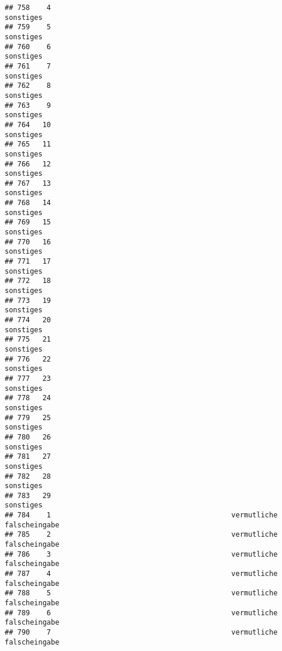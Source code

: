 \documentclass[
]{article}
\begin{document}
\begin{verbatim}
## 758    4                                                           sonstiges
## 759    5                                                           sonstiges
## 760    6                                                           sonstiges
## 761    7                                                           sonstiges
## 762    8                                                           sonstiges
## 763    9                                                           sonstiges
## 764   10                                                           sonstiges
## 765   11                                                           sonstiges
## 766   12                                                           sonstiges
## 767   13                                                           sonstiges
## 768   14                                                           sonstiges
## 769   15                                                           sonstiges
## 770   16                                                           sonstiges
## 771   17                                                           sonstiges
## 772   18                                                           sonstiges
## 773   19                                                           sonstiges
## 774   20                                                           sonstiges
## 775   21                                                           sonstiges
## 776   22                                                           sonstiges
## 777   23                                                           sonstiges
## 778   24                                                           sonstiges
## 779   25                                                           sonstiges
## 780   26                                                           sonstiges
## 781   27                                                           sonstiges
## 782   28                                                           sonstiges
## 783   29                                                           sonstiges
## 784    1                                           vermutliche falscheingabe
## 785    2                                           vermutliche falscheingabe
## 786    3                                           vermutliche falscheingabe
## 787    4                                           vermutliche falscheingabe
## 788    5                                           vermutliche falscheingabe
## 789    6                                           vermutliche falscheingabe
## 790    7                                           vermutliche falscheingabe

\end{verbatim}
\end{document}
